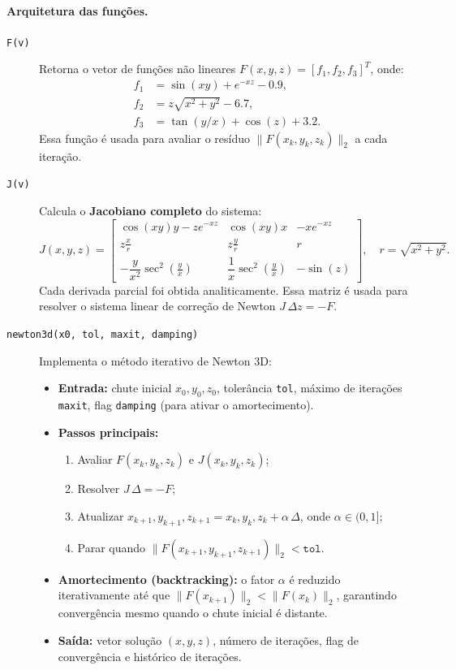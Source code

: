 \documentclass[12pt,a4paper]{article}
\begin{document}
\paragraph{Arquitetura das funções.}
\begin{description}
  \item[\texttt{F(v)}]
  Retorna o vetor de funções não lineares \(F(x,y,z)=[f_1,f_2,f_3]^T\), onde:
  \begin{align*}
  f_1 &= \sin(xy) + e^{-xz} - 0.9,\\
  f_2 &= z\sqrt{x^2 + y^2} - 6.7,\\
  f_3 &= \tan(y/x) + \cos(z) + 3.2.
  \end{align*}
  Essa função é usada para avaliar o resíduo \(\|F(x_k,y_k,z_k)\|_2\) a cada iteração.

  \item[\texttt{J(v)}]
  Calcula o \textbf{Jacobiano completo} do sistema:
  \[
  J(x,y,z)=
  \begin{bmatrix}
  \cos(xy)y - z e^{-xz} & \cos(xy)x & -x e^{-xz}\\
  z\frac{x}{r} & z\frac{y}{r} & r\\
  -\dfrac{y}{x^2}\sec^2\!\left(\tfrac{y}{x}\right) & \dfrac{1}{x}\sec^2\!\left(\tfrac{y}{x}\right) & -\sin(z)
  \end{bmatrix}, \quad r=\sqrt{x^2+y^2}.
  \]
  Cada derivada parcial foi obtida analiticamente. Essa matriz é usada para resolver o sistema linear de correção de Newton \(J\,\Delta z=-F\).

  \item[\texttt{newton3d(x0, tol, maxit, damping)}]
  Implementa o método iterativo de Newton 3D:
  \begin{itemize}
    \item \textbf{Entrada:} chute inicial \(x_0,y_0,z_0\), tolerância \texttt{tol}, máximo de iterações \texttt{maxit}, flag \texttt{damping} (para ativar o amortecimento).
    \item \textbf{Passos principais:}
      \begin{enumerate}
        \item Avaliar \(F(x_k,y_k,z_k)\) e \(J(x_k,y_k,z_k)\);
        \item Resolver \(J\,\Delta = -F\);
        \item Atualizar \(x_{k+1},y_{k+1},z_{k+1} = x_k,y_k,z_k + \alpha\,\Delta\), onde \(\alpha \in (0,1]\);
        \item Parar quando \(\|F(x_{k+1},y_{k+1},z_{k+1})\|_2 < \texttt{tol}\).
      \end{enumerate}
    \item \textbf{Amortecimento (backtracking):} o fator \(\alpha\) é reduzido iterativamente até que \(\|F(x_{k+1})\|_2 < \|F(x_k)\|_2\), garantindo convergência mesmo quando o chute inicial é distante.
    \item \textbf{Saída:} vetor solução \((x,y,z)\), número de iterações, flag de convergência e histórico de iterações.
  \end{itemize}


\end{description}
\end{document}

